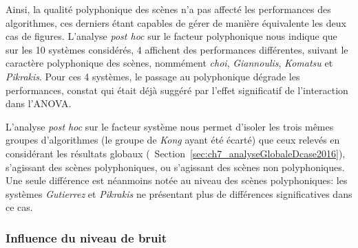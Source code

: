 Ainsi, la qualité polyphonique des scènes n'a pas affecté les performances des algorithmes, ces derniers étant capables de gérer de manière équivalente les deux cas de figures. L'analyse \emph{post hoc} sur le facteur polyphonique nous indique que sur les 10 systèmes considérés, 4 affichent des performances différentes, suivant le caractère polyphonique des scènes, nommément  \emph{choi}, \emph{Giannoulis}, \emph{Komatsu} et \emph{Pikrakis}. Pour ces 4 systèmes, le passage au polyphonique dégrade les performances, constat qui était déjà suggéré par l'effet significatif de l'interaction dans l'ANOVA.

L'analyse \emph{post hoc} sur le facteur système nous permet d'isoler les trois mêmes groupes d'algorithmes (le groupe de \emph{Kong} ayant été écarté) que ceux relevés en considérant les résultats globaux (\cf~Section~\ref{sec:ch7_analyseGlobaleDcase2016}), s'agissant des scènes polyphoniques, ou s'agissant des scènes non polyphoniques. Une seule différence est néanmoins notée au niveau des scènes polyphoniques: les systèmes \emph{Gutierrez} et \emph{Pikrakis} ne présentant plus de différences significatives dans ce cas.

\subsubsection{Influence du niveau de bruit}


